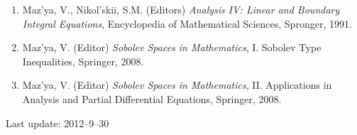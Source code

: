 \documentclass{article}
\newcommand{\authors}[1]{\item #1\ignorespaces}
\renewcommand{\title}[1]{, \textit{#1}\ignorespaces}
\newcommand{\journal}[1]{, {#1}\ignorespaces}
\newcommand{\jitem}[1]{.}
\begin{document}
\begin{enumerate}
\item Maz'ya, V., Nikol'skii, S.M. (Editors) {\it Analysis IV: Linear and Boundary Integral Equations}, Encyclopedia of Mathematical Sciences, Spronger, 1991.

\item Maz'ya, V. (Editor)
 {\it Sobolev Spaces in Mathematics},  I. Sobolev Type Inequalities, Springer,  2008.

\item Maz'ya, V. (Editor)
 {\it Sobolev Spaces in Mathematics},  II. Applications in Analysis and Partial Differential Equations, Springer,  2008.

 

\end{enumerate}

Last update: 2012--9--30
\end{document}

